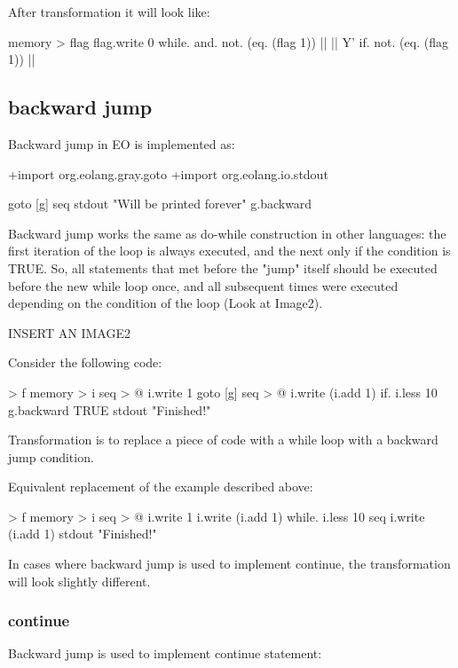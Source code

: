 \documentclass[sigplan,review,11pt,nonacm,natbib=false]{acmart}
\begin{document}
After transformation it will look like:
\begin{ffcode}
memory > flag
flag.write 0
while.
  and.
    not. (eq. (flag 1))
    ||
  ||
    Y'
    if.
      not. (eq. (flag 1))
      ||
\end{ffcode}


\subsection{backward jump}
Backward jump in EO is implemented as:

\begin{ffcode}
+import org.eolang.gray.goto
+import org.eolang.io.stdout

goto
 [g]
  seq
   stdout "Will be printed forever"
   g.backward
\end{ffcode}

Backward jump works the same as do-while construction in other languages: the first iteration of the loop is always executed, and the next only if the condition is TRUE.
So, all statements that met before the "jump" itself should be executed before the new while loop once, and all subsequent times were executed depending on the condition of the loop (Look at Image2).

{INSERT AN IMAGE2}

Consider the following code:
\begin{ffcode}
[] > f
 memory > i
 seq > @
  i.write 1
  goto
   [g]
    seq > @
     i.write (i.add 1)
     if.
      i.less 10
      g.backward
      TRUE
 stdout "Finished!"
\end{ffcode}

Transformation is to replace a piece of code with a while loop with a backward jump condition.

Equivalent replacement of the example described above:
\begin{ffcode}
[] > f
 memory > i
 seq > @
  i.write 1
  i.write (i.add 1)
  while.
   i.less 10
   seq
    i.write (i.add 1)
 stdout "Finished!"
\end{ffcode}

In cases where backward jump is used to implement continue, the transformation will look slightly different.

\subsubsection{continue}
Backward jump is used to implement continue statement:
\end{document}
